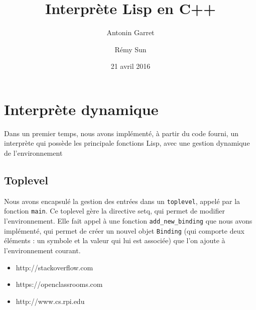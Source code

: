 \documentclass[a4paper,11pt]{article}
\title{Interprète Lisp en C++}
\author{Antonin Garret \and Rémy Sun}
\date{21 avril 2016}
\begin{document}
\maketitle

\section*{Interprète dynamique}

Dans un premier temps, nous avons implémenté, à partir du code fourni, un interprète qui possède les principale fonctions Lisp, avec une gestion dynamique de l'environnement

\subsection*{Toplevel}

Nous avons encapsulé la gestion des entrées dans un \texttt{toplevel}, appelé par la fonction \texttt{main}. Ce toplevel gère la directive setq, qui permet de modifier l'environnement. Elle fait appel à une fonction \texttt{add_new_binding} que nous avons implémenté, qui permet de créer un nouvel objet \texttt{Binding} (qui comporte deux éléments : un symbole et la valeur qui lui est associée) que l'on ajoute à l'environnement courant.



\begin{itemize}
\item http://stackoverflow.com
\item https://openclassrooms.com
\item http://www.cs.rpi.edu
\end{itemize}
\end{document}
